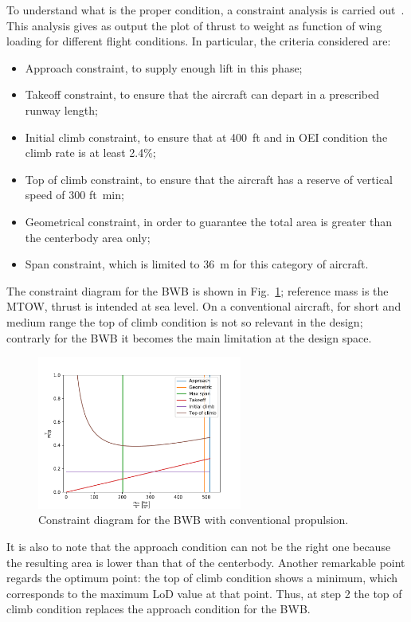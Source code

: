 To understand what is the proper condition, a constraint analysis is carried out~\cite{bib:roskam_partI}. 
This analysis gives as output the plot of thrust to weight as function of wing loading for different flight conditions. 
In particular, the criteria considered are:
\begin{itemize}
	\item Approach constraint, to supply enough lift in this phase;
	\item Takeoff constraint, to ensure that the aircraft can depart in a prescribed runway length;
	\item Initial climb constraint, to ensure that at 400~ft and in OEI condition the climb rate is at least 2.4\%;
	\item Top of climb constraint, to ensure that the aircraft has a reserve of vertical speed of 300 ft\si{\per\minute};
	\item Geometrical constraint, in order to guarantee the total area is greater than the centerbody area only;
	\item Span constraint, which is limited to 36~\si{\meter} for this category of aircraft. 
\end{itemize}

The constraint diagram for the BWB is shown in Fig.~\ref{fig:bwb_constraint_analysis}; reference mass is the MTOW, thrust is intended at sea level. 
On a conventional aircraft, for short and medium range the top of climb condition is not so relevant in the design; contrarly for the BWB it becomes the main limitation at the design space.
\begin{figure}[!h]
	\centering
	\includegraphics[keepaspectratio, width=0.6\textwidth]{images/chap4/bwb_constraint_analysis}
	\caption{Constraint diagram for the BWB with conventional propulsion.}
	\label{fig:bwb_constraint_analysis}
\end{figure}
It is also to note that the approach condition can not be the right one because the resulting area is lower than that of the centerbody. 
Another remarkable point regards the optimum point: the top of climb condition shows a minimum, which corresponds to the maximum LoD value at that point. 
Thus, at step 2 the top of climb condition replaces the approach condition for the BWB.

